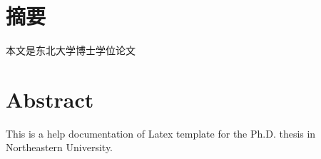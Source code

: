 \chapter{摘\quad 要}%
\linespread{1.5}

本文是东北大学博士学位论文

\chapter{Abstract}%

This is a help documentation of Latex template for the Ph.D. thesis in Northeastern University.

